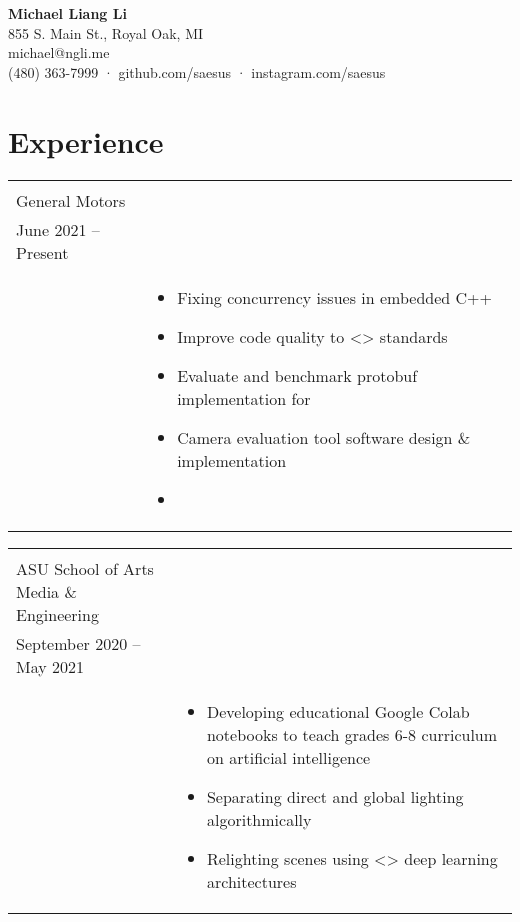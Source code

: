\documentclass[8pt]{article}
\newcommand{\tabu}[2]{
	\begin{tabular}[t]{ l l }
		#1 & #2
	\end{tabular}}
\begin{document}
	
	{\textbf{\huge Michael Liang Li}} \\
	{855 S. Main St., Royal Oak, MI} \\
	{michael@ngli.me} \\
	{(480) 363-7999 · github.com/saesus · instagram.com/saesus}
	\vspace{-1em}
	
	\section{Experience}
		\tabu
		{\begin{minipage}[t]{0.275\linewidth}
				\textbf{TRACK Engineer} \\
				General Motors\\
				June 2021 – Present\\
		\end{minipage}}
		{\begin{minipage}[t]{.725\linewidth}
				\begin{itemize}[noitemsep, topsep=0pt]
					\item Fixing concurrency issues in embedded C++
					\item Improve code quality to <> standards
					\item Evaluate and benchmark protobuf implementation for 
					\item Camera evaluation tool software design \& implementation
					\item 
				\end{itemize}
		\end{minipage}}	
	
		\tabu
		{\begin{minipage}[t]{0.275\linewidth}
				\textbf{ImageSTEM}, Student Worker\\
				ASU School of Arts Media \& Engineering\\
				September 2020 – May 2021\\
		\end{minipage}}
		{\begin{minipage}[t]{.725\linewidth}
				\begin{itemize}[noitemsep, topsep=0pt]
					\item Developing educational Google Colab notebooks to teach grades 6-8 curriculum on artificial intelligence
					\item Separating direct and global lighting algorithmically
					\item Relighting scenes using <> deep learning architectures
				\end{itemize}
		\end{minipage}}	
	
\end{document}
